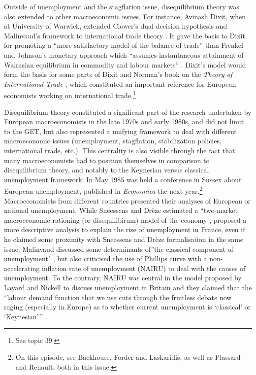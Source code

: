 \documentclass[]{elsarticle} %
\begin{document}
Outside of unemployment and the stagflation issue, disequilibrium theory
was also extended to other macroeconomic issues. For instance, Avinash
Dixit, when at University of Warwick, extended Clower's dual decision
hypothesis and Malinvaud's framework to international trade theory
\citep[393]{dixit1978}. It gave the basis to Dixit for promoting a
``more satisfactory model of the balance of trade'' than Frenkel and
Johnson's \citeyearpar{frenkel1976} monetary approach which ``assumes
instantaneous attainment of Walrasian equilibrium in commodity and
labour markets'' \citep[393]{dixit1978}. Dixit's model would form the
basis for some parts of Dixit and Norman's book on the \emph{Theory of
International Trade} \citep{dixit1980}, which constituted an important
reference for European economists working on international
trade.\footnote{See topic 39.}

Disequilibrium theory constituted a significant part of the research
undertaken by European macroeconomists in the late 1970s and early
1980s, and did not limit to the GET, but also represented a unifying
framework to deal with different macroeconomic issues (unemployment,
stagflation, stabilization policies, international trade, etc.). This
centrality is also visible through the fact that many macroeconomists
had to position themselves in comparison to disequilibrium theory, and
notably to the Keynesian versus classical unemployment framework. In May
1985 was held a conference in Sussex about European unemployment,
published in \emph{Economica} the next year.\footnote{On this episode,
  see Backhouse, Forder and Laskaridis, as well as Plassard and Renault,
  both in this issue.} Macroeconomists from different countries
presented their analyses of European or national unemployment. While
Sneessens and Drèze estimated a ``two-market macroeconomic rationing (or
disequilibirum) model of the economy \citep[S97]{sneessens1986},
\citet{malinvaud1986} proposed a more descriptive analysis to explain
the rise of unemployment in France, even if he claimed some proximity
with Sneessens and Drèze formalisation in the same issue. Malinvaud
discussed some determinants of''the classical component of unemployment"
\citep[S216]{malinvaud1986}, but also criticised the use of Phillips
curve with a non-accelerating inflation rate of unemployment (NAIRU) to
deal with the causes of unemployment. To the contrary, NAIRU was central
in the model proposed by Layard and Nickell to discuss unemployment in
Britain and they claimed that the ``labour demand function that we use
cuts through the fruitless debate now raging (especially in Europe) as
to whether current unemployment is `classical' or `Keynesian'\,''
\citep[S121]{layard1986}.
\end{document}
